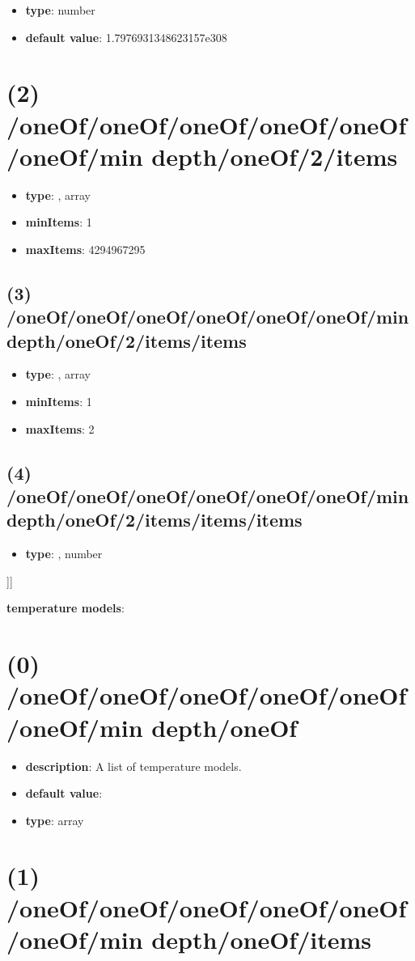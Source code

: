 \begin{itemize}[leftmargin=3em]\item {\bf type}: number\item {\bf default value}: 1.7976931348623157e308
\end{itemize}\section{(2) /oneOf/oneOf/oneOf/oneOf/oneOf/oneOf/min depth/oneOf/2/items}
\begin{itemize}[leftmargin=2em]\item {\bf type}: , array\item {\bf minItems}: 1
\item {\bf maxItems}: 4294967295
\end{itemize}\subsection{(3) /oneOf/oneOf/oneOf/oneOf/oneOf/oneOf/min depth/oneOf/2/items/items}
\begin{itemize}[leftmargin=3em]\item {\bf type}: , array\item {\bf minItems}: 1
\item {\bf maxItems}: 2
\end{itemize}\subsection{(4) /oneOf/oneOf/oneOf/oneOf/oneOf/oneOf/min depth/oneOf/2/items/items/items}
\begin{itemize}[leftmargin=4em]\item {\bf type}: , number\end{itemize}]]\item {\bf temperature models}: \section{(0) /oneOf/oneOf/oneOf/oneOf/oneOf/oneOf/min depth/oneOf}
\begin{itemize}[leftmargin=0em]\item {\bf description}: A list of temperature models.
\item {\bf default value}: 
\item {\bf type}: array
\end{itemize}\section{(1) /oneOf/oneOf/oneOf/oneOf/oneOf/oneOf/min depth/oneOf/items}

